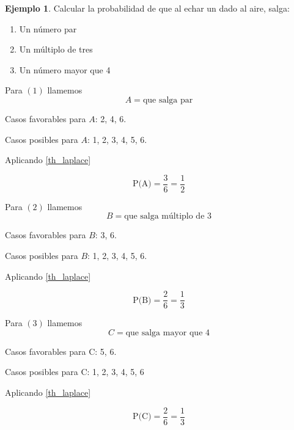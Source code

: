 \documentclass[]{book}
\theoremstyle{plain}
\theoremstyle{definition}
\newtheorem{example}[theorem]{Ejemplo}
\theoremstyle{definition} %
\begin{document}
\begin{example}
  Calcular la probabilidad de que al echar un dado al aire, salga:
\begin{enumerate}[(1)]
  \item Un número par
  \item Un múltiplo de tres
  \item Un número mayor que 4
\end{enumerate}
Para $(1)$
llamemos \[A=\text{que salga par}\]

Casos favorables para $A$: 2, 4, 6.

Casos posibles para $A$: 1, 2, 3, 4, 5, 6.

Aplicando \ref{th_laplace}

$$\displaystyle \text{P(A)}=\frac{3}{6}=\frac{1}{2}$$

Para $(2)$
llamemos \[B=\text{que salga múltiplo de 3}\]

Casos favorables para $B$: 3, 6.

Casos posibles para $B$: 1, 2, 3, 4, 5, 6.

Aplicando \ref{th_laplace}

$$\displaystyle \text{P(B)}=\frac{2}{6}=\frac{1}{3}$$

Para $(3)$ llamemos 
\[C = \text{que salga mayor que 4}\]

Casos favorables para C: 5, 6.

Casos posibles para C: 1, 2, 3, 4, 5, 6

Aplicando \ref{th_laplace}

$$\displaystyle \text{P(C)}=\frac{2}{6}=\frac{1}{3}$$

\end{example}
\end{document}
